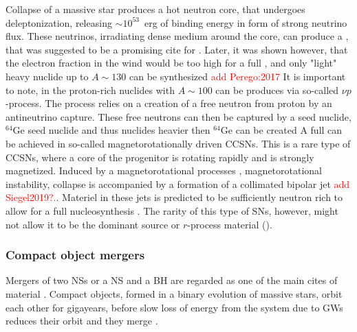 Collapse of a massive star produces a hot neutron core, that undergoes deleptonization, releasing 
$\sim10^{53}$~erg of binding energy in form of strong neutrino flux. These neutrinos, irradiating 
dense medium around the core, can produce a \nwind{} \citep{Qian:1996xt}, that was suggested to be 
a promising cite for \rproc{} \citep{Woosley:2002,Wanajo:2006mq}. Later, it was shown however, that 
the electron fraction in the wind would be too high for a full \rproc{}, and only "light" heavy 
nuclide up to $A\sim130$ can be synthesized 
\citep{Qian:1996xt,Thompson:2001ys,Fischer:2010,Roberts:2010,MartinezPinedo:2012rb,Wanajo:2013} \textcolor{red}{add Perego:2017} 
%
It is important to note, in the proton-rich \nwind{} nuclides with $A\sim 100$ can be produces 
via so-called $\nu p$-process. The process relies on a creation of a free neutron from proton by 
an antineutrino capture. These free neutrons can then be captured by a seed nuclide, $^{64}$Ge seed 
nuclide and thus nuclides heavier then $^{64}$Ge can be created
\citep{Frohlich:2006,Pruet:2005qd,Wanajo:2010mc,Arcones:2012}
%
A full \rproc{} can be achieved in so-called magnetorotationally driven \acp{CCSN}. This is a rare 
type of \acp{CCSN}, where a core of the progenitor is rotating rapidly and is strongly magnetized. 
Induced by a magnetorotational processes \eg, magnetorotational instability, collapse is accompanied by a
formation of a collimated bipolar jet 
\citep{Wheeler:2000,Akiyama:2003,Burrows:2007yx,Mosta:2014jaa,Mosta:2015} \textcolor{red}{add Siegel2019?.}.
Materiel in these jets is predicted to be sufficiently neutron rich to allow for a full \rproc{} 
nucleosynthesis \citep{Winteler:2012,Nishimura:2015nca}. The rarity of this type of \acp{SN}, 
however, might not allow it to be the dominant source or $r$-process material \citep{Nishimura:2015nca} 
(). 


\subsubsection{Compact object mergers}

Mergers of two \acp{NS} or a \ac{NS} and a \ac{BH} are regarded as one of the main cites 
of \rproc{} material . Compact objects, formed in a binary evolution of massive stars, 
orbit each other for gigayears, before slow loss of energy from the system due to \acp{GW} 
reduces their orbit and they merge \citep[\eg][]{Hulse:1975,Lattimer:2004sa,Price:2006fi}. 
%

